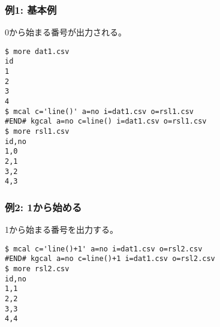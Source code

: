\subsubsection*{例1: 基本例}

0から始まる番号が出力される。


\begin{Verbatim}[baselinestretch=0.7,frame=single]
$ more dat1.csv
id
1
2
3
4
$ mcal c='line()' a=no i=dat1.csv o=rsl1.csv
#END# kgcal a=no c=line() i=dat1.csv o=rsl1.csv
$ more rsl1.csv
id,no
1,0
2,1
3,2
4,3
\end{Verbatim}
\subsubsection*{例2: 1から始める}

1から始まる番号を出力する。


\begin{Verbatim}[baselinestretch=0.7,frame=single]
$ mcal c='line()+1' a=no i=dat1.csv o=rsl2.csv
#END# kgcal a=no c=line()+1 i=dat1.csv o=rsl2.csv
$ more rsl2.csv
id,no
1,1
2,2
3,3
4,4
\end{Verbatim}
